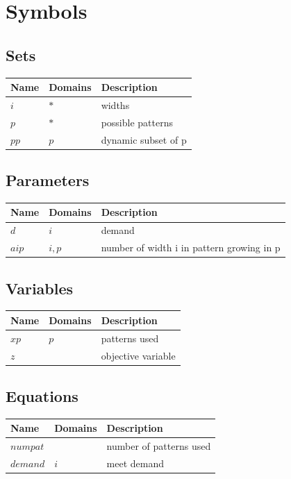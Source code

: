 \documentclass[11pt]{article}
\begin{document}
\section*{Symbols}


\subsection*{Sets}
\begin{tabularx}{\textwidth}{| l | l | X |}
\hline
\textbf{Name} & \textbf{Domains} & \textbf{Description}\\
\hline
\endhead

$i$ & $*$ & widths\\
$p$ & $*$ & possible patterns\\
$pp$ & $p$ & dynamic subset of p\\
\hline
\end{tabularx}
\subsection*{Parameters}
\begin{tabularx}{\textwidth}{| l | l | X |}
\hline
\textbf{Name} & \textbf{Domains} & \textbf{Description}\\
\hline
\endhead

$d$ & $i$ & demand\\
$aip$ & $i,p$ & number of width i in pattern growing in p\\
\hline
\end{tabularx}
\subsection*{Variables}
\begin{tabularx}{\textwidth}{| l | l | X |}
\hline
\textbf{Name} & \textbf{Domains} & \textbf{Description}\\
\hline
\endhead

$xp$ & $p$ & patterns used\\
$z$ &  & objective variable\\
\hline
\end{tabularx}
\subsection*{Equations}
\begin{tabularx}{\textwidth}{| l | l | X |}
\hline
\textbf{Name} & \textbf{Domains} & \textbf{Description}\\
\hline
\endhead

$numpat$ &  & number of patterns used\\
$demand$ & $i$ & meet demand\\
\hline
\end{tabularx}
\end{document}
